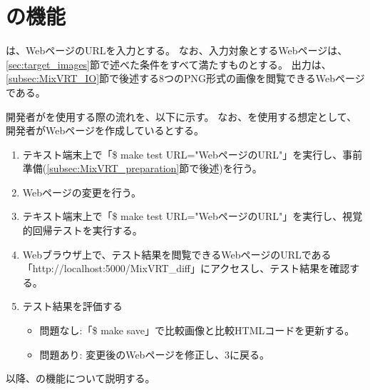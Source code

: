 
\section{\toolName の機能}
\toolName は、WebページのURLを入力とする。
なお、入力対象とするWebページは、\ref{sec:target_images}節で述べた条件をすべて満たすものとする。
出力は、\ref{subsec:MixVRT_IO}節で後述する8つのPNG形式の画像を閲覧できるWebページである。
\par
開発者が\toolName を使用する際の流れを、以下に示す。
なお、\toolName を使用する想定として、開発者がWebページを作成しているとする。
\begin{enumerate}
    \item テキスト端末上で「\$ make test URL="WebページのURL"」を実行し、事前準備(\ref{subsec:MixVRT_preparation}節で後述)を行う。
    \item Webページの変更を行う。
    \item テキスト端末上で「\$ make test URL="WebページのURL"」を実行し、視覚的回帰テストを実行する。
    \item Webブラウザ上で、テスト結果を閲覧できるWebページのURLである「http://localhost:5000/MixVRT\_diff」にアクセスし、テスト結果を確認する。
    \item テスト結果を評価する
          \begin{itemize}
              \item 問題なし:「\$ make save」で比較画像と比較HTMLコードを更新する。
              \item 問題あり: 変更後のWebページを修正し、3に戻る。
          \end{itemize}
\end{enumerate}
以降、\toolName の機能について説明する。

